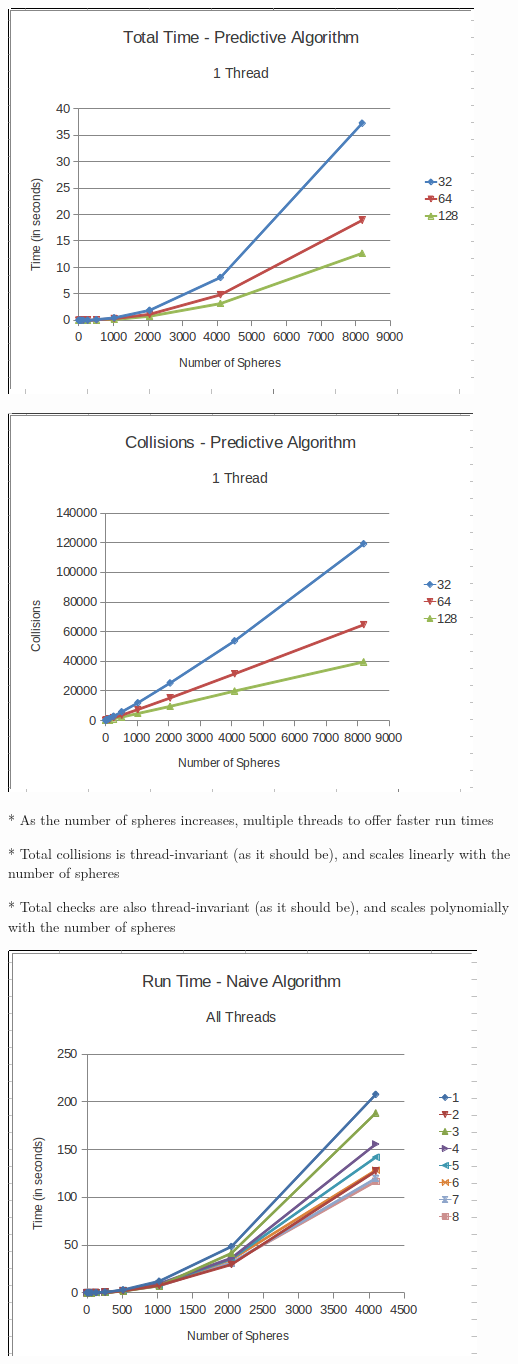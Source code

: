 \documentclass[conference]{IEEEtran}
\begin{document}
\begin{center}
	\includegraphics[width=.45\textwidth]{runtime_predictive_1thread.png}
\end{center}

\begin{center}
	\includegraphics[width=.45\textwidth]{collisions_predictive_1thread.png}
\end{center}

* As the number of spheres increases, multiple threads to offer faster run times

* Total collisions is thread-invariant (as it should be), and scales linearly with the number of spheres

* Total checks are also thread-invariant (as it should be), and scales polynomially with the number of spheres

\begin{center}
	\includegraphics[width=.45\textwidth]{runtime_naive_allthreads.png}
\end{center}
\end{document}
